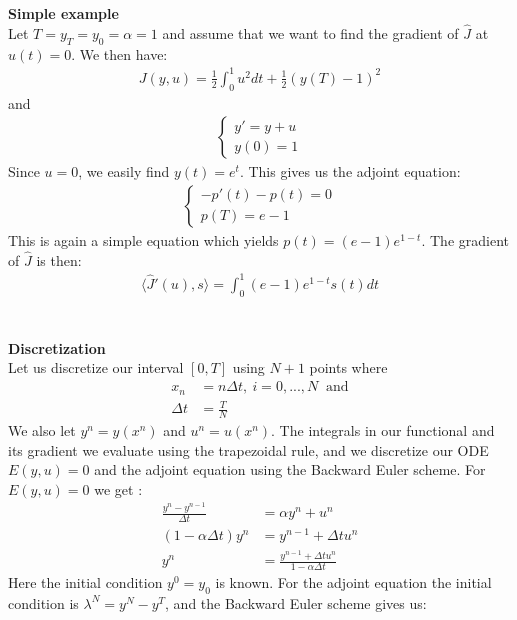 \documentclass[11pt,a4paper]{report}
\begin{document}
\\
\\
\textbf{Simple example}
\\
Let $T=y_T=y_0=\alpha=1$ and assume that we want to find the gradient of $\hat{J}$ at $u(t)=0$. We then have:
\begin{gather}
J(y,u) = \frac{1}{2}\int_0^1u^2dt + \frac{1}{2}(y(T)-1)^2
\end{gather} 
and
\begin{align}
\left\{
     \begin{array}{lr}
       	y' =  y +u\\
       	   y(0)=1
     \end{array}
   \right.
\end{align}
Since $u=0$, we easily find $y(t)=e^t$. This gives us the adjoint equation:
\begin{align}
   \left\{
     \begin{array}{lr}
       -p'(t) -p(t)=0  \\
       p(T) = e-1
     \end{array}
   \right.
\end{align}
This is again a simple equation which yields $p(t)=(e-1)e^{1-t}$. The gradient of $\hat{J}$ is then:
\begin{align*}
\langle\hat{J}'(u),s\rangle=\int_0^1(e-1)e^{1-t}s(t)dt
\end{align*}
\\
\\
\textbf{Discretization}
\\
Let us discretize our interval $[0,T]$ using $N+1$ points where 
\begin{align*}
x_n &= n\Delta t, \ i=0,...,N \ \text{ and} \\
\Delta t &= \frac{T}{N}
\end{align*}
We also let $y^n = y(x^n)$ and $u^n=u(x^n)$. The integrals in our functional and its gradient we evaluate using the trapezoidal rule, and we discretize our ODE $E(y,u)=0$ and the adjoint equation using the Backward Euler scheme. For $E(y,u)=0$ we get :
\begin{align*}
\frac{y^n-y^{n-1}}{\Delta t} &= \alpha y^{n} + u^{n} \\
(1-\alpha\Delta t)y^{n} &= y^{n-1} +\Delta t u^{n} \\
y^n &=\frac{y^{n-1} +\Delta t u^{n}}{1-\alpha\Delta t}
\end{align*} 
Here the initial condition $y^0=y_0$ is known. For the adjoint equation the initial condition is $\lambda^N = y^N-y^T $, and the Backward Euler scheme gives us:
\end{document}
